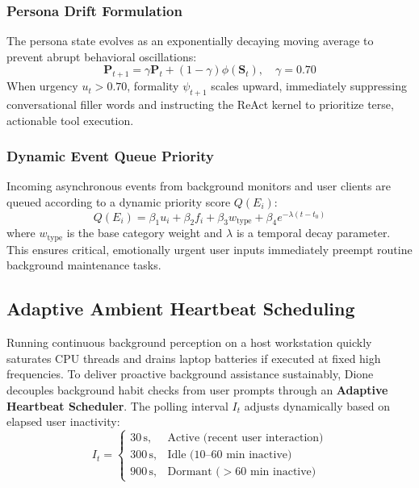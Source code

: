 \documentclass[conference,a4paper]{IEEEtran}
\begin{document}
\subsubsection{Persona Drift Formulation}
The persona state evolves as an exponentially decaying moving average to prevent abrupt behavioral oscillations:
\begin{equation}
\mathbf{P}_{t+1} = \gamma \mathbf{P}_t + (1 - \gamma) \phi(\mathbf{S}_t), \quad \gamma = 0.70
\end{equation}
When urgency $u_t > 0.70$, formality $\psi_{t+1}$ scales upward, immediately suppressing conversational filler words and instructing the ReAct kernel to prioritize terse, actionable tool execution.

\subsubsection{Dynamic Event Queue Priority}
Incoming asynchronous events from background monitors and user clients are queued according to a dynamic priority score $Q(E_i)$:
\begin{equation}
Q(E_i) = \beta_1 u_i + \beta_2 f_i + \beta_3 w_{\text{type}} + \beta_4 e^{-\lambda (t - t_0)}
\end{equation}
where $w_{\text{type}}$ is the base category weight and $\lambda$ is a temporal decay parameter. This ensures critical, emotionally urgent user inputs immediately preempt routine background maintenance tasks.

\subsection{Adaptive Ambient Heartbeat Scheduling}
Running continuous background perception on a host workstation quickly saturates CPU threads and drains laptop batteries if executed at fixed high frequencies. To deliver proactive background assistance sustainably, Dione decouples background habit checks from user prompts through an \textbf{Adaptive Heartbeat Scheduler}. The polling interval $I_t$ adjusts dynamically based on elapsed user inactivity:
\begin{equation}
I_t = 
\begin{cases}
    30\,\text{s}, & \text{Active (recent user interaction)} \\
    300\,\text{s}, & \text{Idle (10--60 min inactive)} \\
    900\,\text{s}, & \text{Dormant ($>60$ min inactive)}
\end{cases}
\end{equation}
\end{document}
